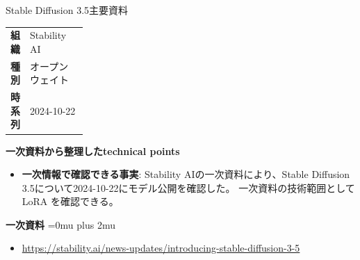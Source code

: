 \begin{technicalnote}{Stable Diffusion 3.5}{主要資料}
\begingroup
\begin{tabularx}{\linewidth}{@{}>{\bfseries}p{0.22\linewidth}X@{}}
組織 & Stability AI \\
種別 & オープンウェイト \\
時系列 & 2024-10-22 \\
\end{tabularx}
\smallskip
{\bfseries 一次資料から整理したtechnical points}
\begin{itemize}[leftmargin=1.5em,itemsep=0.35em]
\item \textbf{一次情報で確認できる事実}: Stability AIの一次資料により、Stable Diffusion 3.5について2024-10-22にモデル公開を確認した。 一次資料の技術範囲として LoRA を確認できる。
\end{itemize}
\begin{minipage}{\linewidth}
\begin{samepage}
{\bfseries 一次資料}
\begingroup\sloppy
\Urlmuskip=0mu plus 2mu\relax
\begin{itemize}[leftmargin=1.5em,itemsep=0.25em]
\item {\scriptsize\url{https://stability.ai/news-updates/introducing-stable-diffusion-3-5}}
\end{itemize}
\endgroup
\end{samepage}
\end{minipage}
\endgroup
\end{technicalnote}
\medskip

